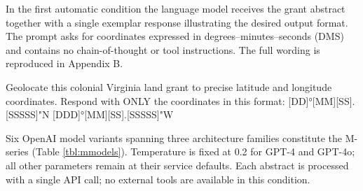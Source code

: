 \documentclass[
  11pt,
]{article}
\newenvironment{Shaded}{}{}
\newcommand{\NormalTok}[1]{#1}
\begin{document}
In the first automatic condition the language model receives the grant
abstract together with a single exemplar response illustrating the
desired output format. The prompt asks for coordinates expressed in
degrees--minutes--seconds (DMS) and contains no chain-of-thought or tool
instructions. The full wording is reproduced in Appendix B.

\begin{Shaded}
\begin{Highlighting}[]
\NormalTok{Geolocate this colonial Virginia land grant to precise latitude and longitude coordinates.}
\NormalTok{Respond with ONLY the coordinates in this format: [DD]°[MM]\textquotesingle{}[SS].[SSSSS]"N [DDD]°[MM]\textquotesingle{}[SS].[SSSSS]"W}
\end{Highlighting}
\end{Shaded}

Six OpenAI model variants spanning three architecture families
constitute the M-series (Table \autoref{tbl:mmodels}). Temperature is
fixed at 0.2 for GPT-4 and GPT-4o; all other parameters remain at their
service defaults. Each abstract is processed with a single API call; no
external tools are available in this condition.
\end{document}
